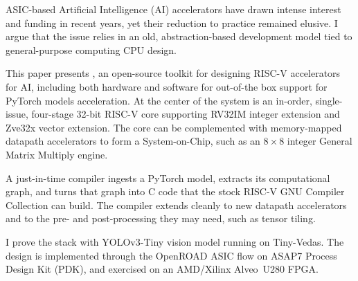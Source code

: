 
ASIC-based Artificial Intelligence (AI) accelerators have drawn intense interest
and funding in recent years, yet their reduction to practice remained elusive.
I argue that the issue relies in an old, abstraction-based development model
tied to general-purpose computing CPU design.


This paper presents \tv{}, an open-source toolkit for designing {RISC-V} accelerators
for {AI}, including both hardware and software for out-of-the box
support for PyTorch models acceleration.
At the center of the system is an in-order, single-issue, four-stage
32-bit {RISC-V} core supporting {RV32IM} integer extension and {Zve32x} vector extension.
The core can be complemented with memory-mapped datapath accelerators to form a System-on-Chip,
such as an $8{\times}8$ integer General Matrix
Multiply engine.

A just-in-time compiler ingests a {PyTorch} model, extracts
its computational graph, and turns that graph into {C} code that the stock
{RISC-V} {GNU} Compiler Collection can build.
The compiler extends cleanly to new datapath accelerators and to the
pre- and post-processing they may need, such as tensor tiling.

I prove the stack with {YOLOv3-Tiny} vision model running on Tiny-Vedas.
The design is implemented through the Open{ROAD}
{ASIC} flow on {ASAP7}
Process Design Kit ({PDK}), and exercised on an AMD/Xilinx Alveo~{U280} FPGA.
